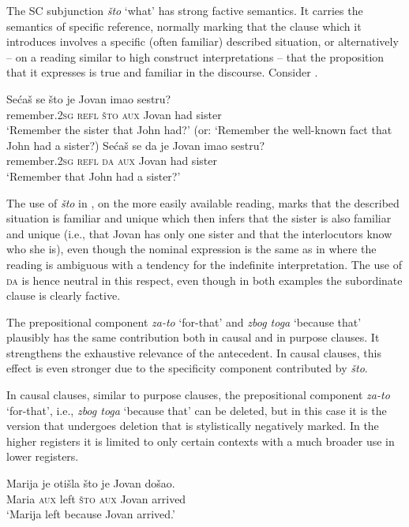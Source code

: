 \documentclass[output=paper]{langscibook}
\begin{document}
\noindent The SC subjunction \textit{što} `what' has strong factive semantics. It carries the semantics of specific reference, normally marking that the clause which it introduces involves a specific (often familiar) described situation, or alternatively -- on a reading similar to high construct interpretations -- that the proposition that it expresses is true and familiar in the discourse. Consider .

\ea\label{ex:Sto-da}
    \ea \gll Sećaš se što je Jovan imao sestru?\\
    remember.\textsc{2sg} \textsc{refl} \textsc{što} \textsc{aux} Jovan had sister\\
    \glt `Remember the sister that John had?'
    \glt (or: `Remember the well-known fact that John had a sister?)\label{ex:Što-da-a}
	\ex \gll Sećaš se da je Jovan imao sestru?\\
    remember.\textsc{2sg} \textsc{refl} \textsc{da} \textsc{aux} Jovan had sister\\
    \glt `Remember that John had a sister?'\label{ex:Što-da-b}
\z\z

\noindent The use of \textit{što} in , on the more easily available reading, marks that the described situation is familiar and unique which then infers that the sister is also familiar and unique (i.e., that Jovan has only one sister and that the interlocutors know who she is), even though the nominal expression is the same as in  where the reading is ambiguous with a tendency for the indefinite interpretation. The use of \textsc{da} is hence neutral in this respect, even though in both examples the subordinate clause is clearly factive.

The prepositional component \textit{za-to} `for-that' and \textit{zbog toga} `because that' plausibly has the same contribution both in causal and in purpose clauses. It strengthens the exhaustive relevance of the antecedent. In causal clauses, this effect is even stronger due to the specificity component contributed by \textit{što}.

In causal clauses, similar to purpose clauses, the prepositional component \textit{za-to} `for-that', i.e., \textit{zbog toga} `because that' can be deleted, but in this case it is the version that undergoes deletion that is stylistically negatively marked. In the higher registers it is limited to only certain contexts with a much broader use in lower registers.

\ea\label{ex:elide-zato}
    \gll Marija je otišla što je Jovan došao.\\
    Maria \textsc{aux} left \textsc{što} \textsc{aux} Jovan arrived\\
    \glt `Marija left because Jovan arrived.'
\z
\end{document}
